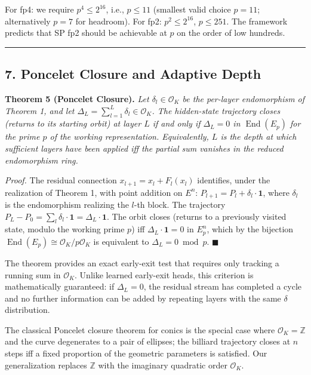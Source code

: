 \documentclass[
  11pt,
]{article}
\begin{document}
For fp4: we require \(p^4 \leq 2^{16}\), i.e., \(p \leq 11\) (smallest
valid choice \(p = 11\); alternatively \(p = 7\) for headroom). For fp2:
\(p^2 \leq 2^{16}\), \(p \leq 251\). The framework predicts that SP fp2
should be achievable at \(p\) on the order of low hundreds.

\begin{center}\rule{0.5\linewidth}{0.5pt}\end{center}

\hypertarget{poncelet-closure-and-adaptive-depth}{%
\subsection{7. Poncelet Closure and Adaptive
Depth}\label{poncelet-closure-and-adaptive-depth}}

\textbf{Theorem 5 (Poncelet Closure).} \emph{Let
\(\delta_l \in \mathcal{O}_K\) be the per-layer endomorphism of Theorem
1, and let \(\Delta_L = \sum_{l=1}^L \delta_l \in \mathcal{O}_K\). The
hidden-state trajectory closes (returns to its starting orbit) at layer
\(L\) if and only if \(\Delta_L = 0\) in \(\operatorname{End}(E_p)\) for
the prime \(p\) of the working representation. Equivalently, \(L\) is
the depth at which sufficient layers have been applied iff the partial
sum vanishes in the reduced endomorphism ring.}

\emph{Proof.} The residual connection \(x_{l+1} = x_l + F_l(x_l)\)
identifies, under the realization of Theorem 1, with point addition on
\(E^n\): \(P_{l+1} = P_l + \delta_l \cdot \mathbf{1}\), where
\(\delta_l\) is the endomorphism realizing the \(l\)-th block. The
trajectory
\(P_L - P_0 = \sum_l \delta_l \cdot \mathbf{1} = \Delta_L \cdot \mathbf{1}\).
The orbit closes (returns to a previously visited state, modulo the
working prime \(p\)) iff \(\Delta_L \cdot \mathbf{1} = 0\) in \(E_p^n\),
which by the bijection
\(\operatorname{End}(E_p) \cong \mathcal{O}_K / p\mathcal{O}_K\) is
equivalent to \(\Delta_L = 0 \bmod p\). \(\blacksquare\)

The theorem provides an exact early-exit test that requires only
tracking a running sum in \(\mathcal{O}_K\). Unlike learned early-exit
heads, this criterion is mathematically guaranteed: if \(\Delta_L = 0\),
the residual stream has completed a cycle and no further information can
be added by repeating layers with the same \(\delta\) distribution.

The classical Poncelet closure theorem for conics is the special case
where \(\mathcal{O}_K = \mathbb{Z}\) and the curve degenerates to a pair
of ellipses; the billiard trajectory closes at \(n\) steps iff a fixed
proportion of the geometric parameters is satisfied. Our generalization
replaces \(\mathbb{Z}\) with the imaginary quadratic order
\(\mathcal{O}_K\).
\end{document}
